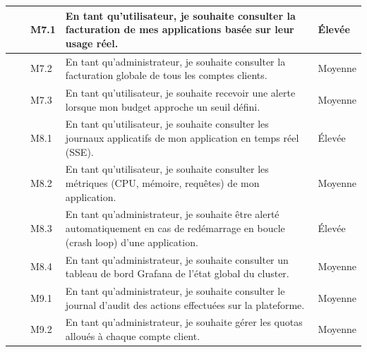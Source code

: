 {\begin{longtable}{|>{\centering\arraybackslash}m{0.8cm}|>{\centering\arraybackslash}m{2.6cm}|>{\centering\arraybackslash}m{1.1cm}|>{\raggedright\arraybackslash}p{6.1cm}|>{\centering\arraybackslash}m{2.3cm}|}
    \multirow{3}{*}{M7} & \multirow{3}{2.6cm}{\centering Facturation}
     & M7.1 & En tant qu'utilisateur, je souhaite consulter la facturation de mes applications basée sur leur usage réel. & Élevée \\
    \cline{3-5}
     && M7.2 & En tant qu'administrateur, je souhaite consulter la facturation globale de tous les comptes clients. & Moyenne \\
    \cline{3-5}
     && M7.3 & En tant qu'utilisateur, je souhaite recevoir une alerte lorsque mon budget approche un seuil défini. & Moyenne \\
    \hline
    
    \multirow{4}{*}{M8} & \multirow{4}{2.6cm}{\centering Monitoring \& Observabilité}
     & M8.1 & En tant qu'utilisateur, je souhaite consulter les journaux applicatifs de mon application en temps réel (SSE). & Élevée \\
    \cline{3-5}
     && M8.2 & En tant qu'utilisateur, je souhaite consulter les métriques (CPU, mémoire, requêtes) de mon application. & Moyenne \\
    \cline{3-5}
     && M8.3 & En tant qu'administrateur, je souhaite être alerté automatiquement en cas de redémarrage en boucle (crash loop) d'une application. & Élevée \\
    \cline{3-5}
     && M8.4 & En tant qu'administrateur, je souhaite consulter un tableau de bord Grafana de l'état global du cluster. & Moyenne \\
    \hline
    
    \multirow{2}{*}{M9} & \multirow{2}{2.6cm}{\centering Administration plateforme}
     & M9.1 & En tant qu'administrateur, je souhaite consulter le journal d'audit des actions effectuées sur la plateforme. & Moyenne \\
    \cline{3-5}
     && M9.2 & En tant qu'administrateur, je souhaite gérer les quotas alloués à chaque compte client. & Moyenne \\
    \hline
    

\end{longtable}}
